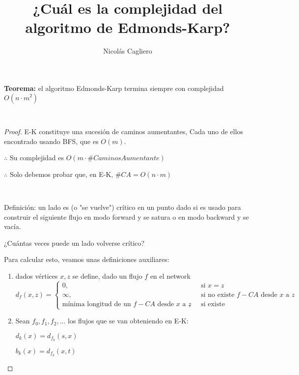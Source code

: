 \documentclass[11pt]{article}
\title{¿Cuál es la complejidad del algoritmo de Edmonds-Karp?}
\author{Nicolás Cagliero}
\begin{document}
\maketitle
\textbf{Teorema:} el algoritmo Edmonds-Karp termina siempre con complejidad $O(n \cdot m^{2}) $ \par 
\

\begin{proof}E-K constituye una sucesión de caminos aumentantes, Cada uno de ellos encontrado usando BFS, que es $O(m)$.\par

\begin{center}
	$\therefore$ Su complejidad es $O(m \cdot \#CaminosAumentante)$\par
\end{center}
\begin{center}
	$\therefore$ Solo debemos probar que, en E-K, $\#CA = O(n \cdot m)$
\end{center}
\

Definición: un lado es (o "se vuelve") crítico en un punto dado si es usado para construir el siguiente flujo en modo forward y se satura o en modo backward y se vacía.

\begin{center}
	¿Cuántas veces puede un lado volverse crítico?\par
\end{center}

Para calcular esto, veamos unas definiciones auxiliares:\par

\begin{enumerate}
\item dados vértices $x, z$ se define, dado un flujo $f$ en el network
\[   
d_f(x,z) = 
     \begin{cases}
       \text{\(0\)}, &\quad\text{si \(x=z\)}\\
       \text{\(\infty\)}, &\quad\text{si no existe \(f-CA\) desde \(x\) a \(z\)}\\
       \text{mínima longitud de un \(f-CA\) desde \(x\) a \(z\)}, &\quad\text{si existe}
     \end{cases}
\]

\item Sean $f_0, f_1, f_2, ...$  los flujos que se van obteniendo en E-K:
\begin{center}
	$d_k(x) = d_{f_k}(s, x)$\par
	$b_k(x) = d_{f_k}(x, t)$\par
\end{center}


\end{enumerate}
\end{proof}
\end{document}
